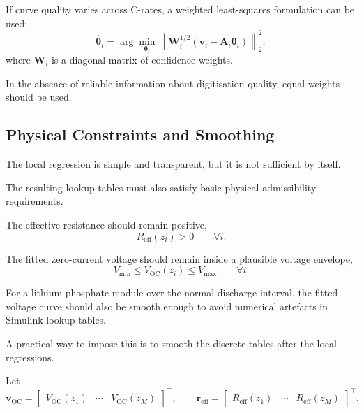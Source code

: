 \documentclass[a4paper,12pt]{article}
\newcommand{\mat}[1]{\mathbf{#1}}
\newcommand{\vect}[1]{\bm{#1}}
\begin{document}
If curve quality varies across C-rates, a weighted least-squares formulation can be used:
\begin{equation}
\hat{\vect{\theta}}_i
=
\arg\min_{\vect{\theta}_i}
\left\|
\mat{W}_i^{1/2}
\left(
\vect{v}_i-\mat{A}_i\vect{\theta}_i
\right)
\right\|_2^2,
\label{eq:method_weighted_ls_problem}
\end{equation}
where \(\mat{W}_i\) is a diagonal matrix of confidence weights.

In the absence of reliable information about digitisation quality, equal weights should be used.

\subsection{Physical Constraints and Smoothing}

The local regression is simple and transparent, but it is not sufficient by itself.

The resulting lookup tables must also satisfy basic physical admissibility requirements.

The effective resistance should remain positive,
\begin{equation}
R_{\mathrm{eff}}(z_i)>0
\qquad
\forall i.
\label{eq:method_reff_positive}
\end{equation}

The fitted zero-current voltage should remain inside a plausible voltage envelope,
\begin{equation}
V_{\min}
\leq
V_{\mathrm{OC}}(z_i)
\leq
V_{\max}
\qquad
\forall i.
\label{eq:method_ocv_voltage_bounds}
\end{equation}

For a lithium-phosphate module over the normal discharge interval, the fitted voltage curve should also be smooth enough to avoid numerical artefacts in Simulink lookup tables.

A practical way to impose this is to smooth the discrete tables after the local regressions.

Let
\[
\vect{v}_{\mathrm{OC}}
=
\begin{bmatrix}
V_{\mathrm{OC}}(z_1) &
\cdots &
V_{\mathrm{OC}}(z_M)
\end{bmatrix}^{\top},
\qquad
\vect{r}_{\mathrm{eff}}
=
\begin{bmatrix}
R_{\mathrm{eff}}(z_1) &
\cdots &
R_{\mathrm{eff}}(z_M)
\end{bmatrix}^{\top}.
\]
\end{document}
